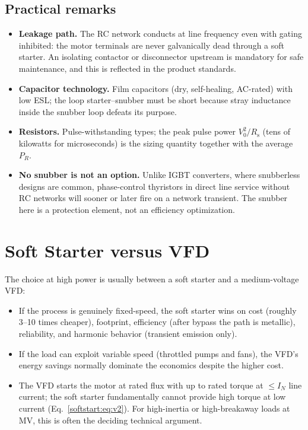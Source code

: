 \subsection{Practical remarks}

\begin{itemize}
  \item \textbf{Leakage path.} The RC network conducts at line frequency even
        with gating inhibited: the motor terminals are never galvanically
        dead through a soft starter. An isolating contactor or disconnector
        upstream is mandatory for safe maintenance, and this is reflected in
        the product standards.
  \item \textbf{Capacitor technology.} Film capacitors (dry, self-healing,
        AC-rated) with low ESL; the loop starter--snubber must be short
        because stray inductance inside the snubber loop defeats its
        purpose.
  \item \textbf{Resistors.} Pulse-withstanding types; the peak pulse power
        $V_0^2/R_\mathrm{s}$ (tens of kilowatts for microseconds) is the
        sizing quantity together with the average $P_R$.
  \item \textbf{No snubber is not an option.} Unlike IGBT converters, where
        snubberless designs are common, phase-control thyristors in direct
        line service without RC networks will sooner or later fire on a
        network transient. The snubber here is a protection element, not an
        efficiency optimization.
\end{itemize}

\section{Soft Starter versus VFD}

The choice at high power is usually between a soft starter and a
medium-voltage VFD:

\begin{itemize}
  \item If the process is genuinely fixed-speed, the soft starter wins on
        cost (roughly 3--10 times cheaper), footprint, efficiency (after
        bypass the path is metallic), reliability, and harmonic behavior
        (transient emission only).
  \item If the load can exploit variable speed (throttled pumps and fans),
        the VFD's energy savings normally dominate the economics despite the
        higher cost.
  \item The VFD starts the motor at rated flux with up to rated torque at
        $\leq I_N$ line current; the soft starter fundamentally cannot
        provide high torque at low current
        (Eq.~\eqref{softstart:eq:v2}). For high-inertia or high-breakaway loads at MV,
        this is often the deciding technical argument.
\end{itemize}

